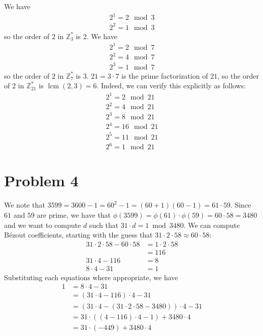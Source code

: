 \documentclass[12pt]{article}
\numberwithin{equation}{section}
\theoremstyle{plain}
\DeclareMathOperator*{\lcm}{lcm}
\begin{document}
We have
\begin{gather*}
    2^1 = 2 \mod 3\\
    2^2 = 1 \mod 3
\end{gather*}
so the order of $2$ in $\mathbb{Z}^*_{3}$ is 2.
We have
\begin{gather*}
    2^1 = 2 \mod 7\\
    2^2 = 4 \mod 7\\
    2^3 = 1 \mod 7
\end{gather*}
so the order of $2$ in $\mathbb{Z}^*_{7}$ is 3.
$21 = 3 \cdot 7$ is the prime factorization of $21$,
so the order of $2$ in $\mathbb{Z}^*_{21}$ is $\lcm(2, 3) = 6$.
Indeed, we can verify this explicitly as follows:
\begin{gather*}
    2^1 = 2 \mod 21\\
    2^2 = 4 \mod 21\\
    2^3 = 8 \mod 21\\
    2^4 = 16 \mod 21\\
    2^5 = 11 \mod 21\\
    2^6 = 1 \mod 21
\end{gather*}

\section*{Problem 4}

We note that $3599 = 3600 - 1 = 60^2 - 1 = (60+1)(60-1) = 61 \cdot 59$.
Since $61$ and $59$ are prime,
we have that $\phi(3599) = \phi(61) \cdot \phi(59) = 60 \cdot 58 = 3480$
and we want to compute $d$ such that $31 \cdot d = 1 \bmod 3480$.
We can compute B\'ezout coefficients, starting with the guess that $31 \cdot 2 \cdot 58 \approx 60 \cdot 58$:
\begin{align*}
    31 \cdot 2 \cdot 58 - 60 \cdot 58
        &= 1 \cdot 2 \cdot 58\\
        &= 116\\
    31 \cdot 4 - 116
        &= 8\\
    8 \cdot 4 - 31
        &= 1
\end{align*}
Substituting each equations where appropriate, we have
\begin{align*}
    1
        &= 8 \cdot 4 - 31\\
        &= (31 \cdot 4 - 116) \cdot 4 - 31\\
        &= (31 \cdot 4 - (31 \cdot 2 \cdot 58 - 3480)) \cdot 4 - 31\\
        &= 31 \cdot ((4 - 116) \cdot 4 - 1) + 3480 \cdot 4\\
        &= 31 \cdot (-449) + 3480 \cdot 4
\end{align*}
\end{document}
